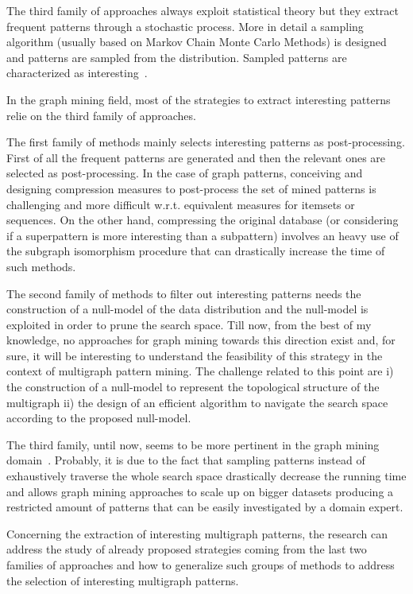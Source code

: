 The third family of approaches always exploit statistical theory but they extract frequent patterns through a stochastic process. More in detail a sampling algorithm (usually based on Markov Chain Monte Carlo Methods) is designed and patterns are sampled from the distribution. Sampled patterns are characterized as interesting~\cite{RiondatoU15,SahaH15,WangCF13,HasanZ09}.

In the graph mining field, most of the strategies to extract interesting patterns relie on the third family of approaches.

The first family of methods mainly selects interesting patterns as post-processing. First of all the frequent patterns are generated and then the relevant ones are selected as post-processing. In the case of graph patterns, conceiving and designing compression measures to post-process the set of mined patterns is challenging and more difficult w.r.t. equivalent measures for itemsets or sequences. On the other hand, compressing the original database (or considering if a superpattern is more interesting than a subpattern) involves an heavy use of the subgraph isomorphism procedure that can drastically increase the time of such methods.

The second family of methods to filter out interesting patterns needs the construction of a null-model of the data distribution and the null-model is exploited in order to prune the search space. Till now, from the best of my knowledge, no approaches for graph mining towards this direction exist and, for sure, it will be interesting to understand the feasibility of this strategy in the context of multigraph pattern mining. The challenge related to this point are i) the construction of a null-model to represent the topological structure of the multigraph ii) the design of an efficient algorithm to navigate the search space according to the proposed null-model.

The third family, until now, seems to be more pertinent in the graph mining domain~\cite{HasanZ09}. Probably, it is due to the fact that sampling patterns instead of exhaustively traverse the whole search space drastically decrease the running time and allows graph mining approaches to scale up on bigger datasets producing a restricted amount of patterns that can be easily investigated by a domain expert.

Concerning the extraction of interesting multigraph patterns, the research can address the study of already proposed strategies coming from the last two families of approaches and how to generalize such groups of methods to address the selection of interesting multigraph patterns.

